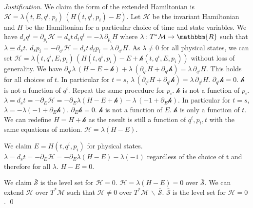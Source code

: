 \documentclass[aps,pra,10pt,twocolumn,floatfix,nofootinbib]{revtex4-1}
\numberwithin{equation}{section}
\theoremstyle{definition}
\newenvironment{justification}{\emph{Justification}.}{\qed}
\begin{document}
\begin{justification}
	We claim the form of the extended Hamiltonian is $\mathcal{H} = \lambda(t,E,q^i,p_i) \, (H(t,q^i,p_i) - E)$. Let $\mathcal{H}$ be the invariant Hamiltonian and $H$ be the Hamiltonian for a particular choice of time and state variables. We have $d_s q^i = \partial_{p_i} \mathcal{H} = d_s t \, d_t q^i = - \lambda \, \partial_{p_i} H$ where $\lambda : T^*\mathcal{M} \rightarrow \mathbbm{R}$ such that $\lambda \equiv d_s t$. $d_s p_i = - \partial_{q^i} \mathcal{H} = d_s t \, d_t p_i = \lambda \, \partial_{q^i} H$. As $\lambda \neq 0$ for all physical states, we can set $\mathcal{H} = \lambda(t,q^i,E,p_i) \, (H(t,q^i,p_i) - E + \mathcal{h}(t,q^i,E,p_i))$ without loss of generality. We have $\partial_{q^i} \lambda \, (H - E + \mathcal{h}) + \lambda \, (\partial_{q^i} H + \partial_{q^i} \mathcal{h}) = \lambda \, \partial_{q^i} H$. This holds for all choices of $t$. In particular for $t=s$, $\lambda \, (\partial_{q^i} H + \partial_{q^i} \mathcal{h}) = \lambda \, \partial_{q^i} H$. $\partial_{q^i} \mathcal{h} = 0$. $\mathcal{h}$ is not a function of $q^i$. Repeat the same procedure for $p_i$. $\mathcal{h}$ is not a function of $p_i$. $\lambda = d_s t = - \partial_E \mathcal{H} = - \partial_{E} \lambda (H - E + \mathcal{h}) - \lambda \, (-1 + \partial_{E} \mathcal{h})$. In particular for $t=s$, $\lambda = - \lambda (-1 + \partial_{E} \mathcal{h})$. $\partial_{E} \mathcal{h} = 0$. $\mathcal{h}$ is not a function of $E$. $\mathcal{h}$ is only a function of $t$. We can redefine $H = H + \mathcal{h}$ as the result is still a function of $q^i, p_i , t$ with the same equations of motion. $\mathcal{H}=\lambda (H - E)$.
	
	We claim $E = H(t,q^i,p_i)$ for physical states. $\lambda = d_s t = - \partial_E \mathcal{H} = - \partial_{E} \lambda (H - E) - \lambda (-1)$ regardless of the choice of t and therefore for all $\lambda$. $H - E = 0$. 
	
	We claim $\bar{\mathcal{S}}$ is the level set for $\mathcal{H} = 0$. $\mathcal{H} = \lambda (H - E) = 0$ over $\bar{\mathcal{S}}$. We can extend $\mathcal{H}$ over $T^* \mathcal{M}$ such that $\mathcal{H} \neq 0$ over $T^*\mathcal{M} \,\backslash\, \bar{\mathcal{S}}$. $\bar{\mathcal{S}}$ is the level set for $\mathcal{H} = 0$.
\end{justification}
\end{document}
